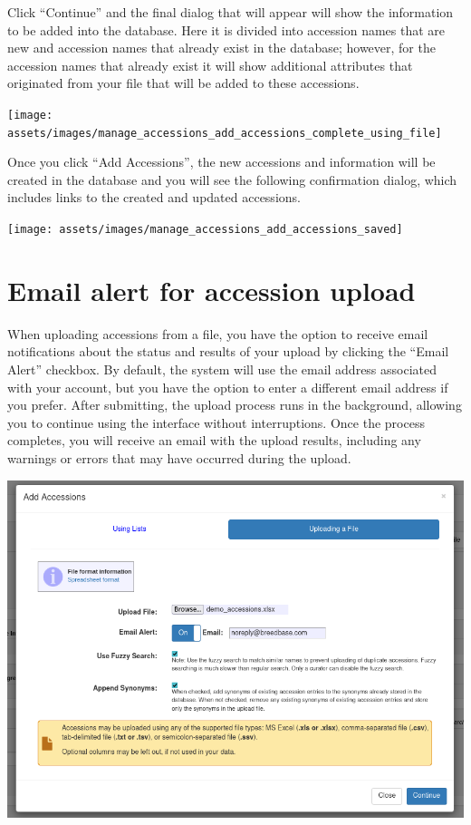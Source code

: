 \documentclass[
  12pt,
]{book}
\begin{document}
Click ``Continue'' and the final dialog that will appear will show the information to be added into the database. Here it is divided into accession names that are new and accession names that already exist in the database; however, for the accession names that already exist it will show additional attributes that originated from your file that will be added to these accessions.

\begin{center}\texttt{[image: assets/images/manage\_accessions\_add\_accessions\_complete\_using\_file]} \end{center}

Once you click ``Add Accessions'', the new accessions and information will be created in the database and you will see the following confirmation dialog, which includes links to the created and updated accessions.

\begin{center}\texttt{[image: assets/images/manage\_accessions\_add\_accessions\_saved]} \end{center}

\hypertarget{email-alert-for-accession-upload}{%
\section{Email alert for accession upload}\label{email-alert-for-accession-upload}}

When uploading accessions from a file, you have the option to receive email notifications about the status and results of your upload by clicking the ``Email Alert'' checkbox. By default, the system will use the email address associated with your account, but you have the option to enter a different email address if you prefer. After submitting, the upload process runs in the background, allowing you to continue using the interface without interruptions. Once the process completes, you will receive an email with the upload results, including any warnings or errors that may have occurred during the upload.

\begin{center}\includegraphics[width=0.75\linewidth]{assets/images/accession_upload_using_email} \end{center}
\end{document}
